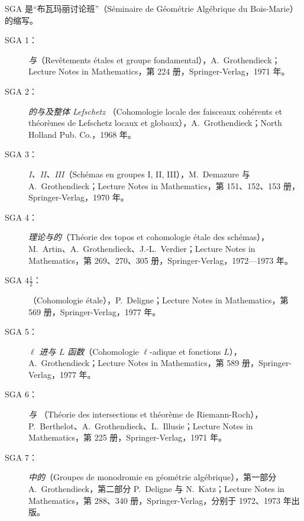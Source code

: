 SGA 是“布瓦玛丽讨论班”（Séminaire de Géométrie Algébrique du Bois-Marie）的缩写。
\begin{description}
\item[SGA 1：] \emph{与}（Revêtements étales et groupe fondamental），A.~Grothendieck；Lecture Notes in Mathematics，第 224 册，Springer-Verlag，1971 年。
\item[SGA 2：] \emph{的与及整体 Lefschetz }（Cohomologie locale des faisceaux cohérents et théorèmes de Lefschetz locaux et globaux），A.~Grothendieck；North Holland Pub. Co.，1968 年。
\item[SGA 3：] \emph{ I、II、III}（Schémas en groupes I, II, III），M.~Demazure 与 A.~Grothendieck；Lecture Notes in Mathematics，第 151、152、153 册，Springer-Verlag，1970 年。
\item[SGA 4：] \emph{理论与的}（Théorie des topos et cohomologie étale des schémas），M.~Artin、A.~Grothendieck、J.-L.~Verdier；Lecture Notes in Mathematics，第 269、270、305 册，Springer-Verlag，1972—1973 年。
\item[SGA $4\frac12$：] \emph{}（Cohomologie étale），P.~Deligne；Lecture Notes in Mathematics，第 569 册，Springer-Verlag，1977 年。
\item[SGA 5：] \emph{$\ell$ 进与 $L$ 函数}（Cohomologie $\ell$-adique et fonctions $L$），A.~Grothendieck；Lecture Notes in Mathematics，第 589 册，Springer-Verlag，1977 年。
\item[SGA 6：] \emph{与 }（Théorie des intersections et théorème de Riemann-Roch），P.~Berthelot、A.~Grothendieck、L.~Illusie；Lecture Notes in Mathematics，第 225 册，Springer-Verlag，1971 年。
\item[SGA 7：] \emph{中的}（Groupes de monodromie en géométrie algébrique），第一部分 A.~Grothendieck，第二部分 P.~Deligne 与 N.~Katz；Lecture Notes in Mathematics，第 288、340 册，Springer-Verlag，分别于 1972、1973 年出版。
\end{description}

